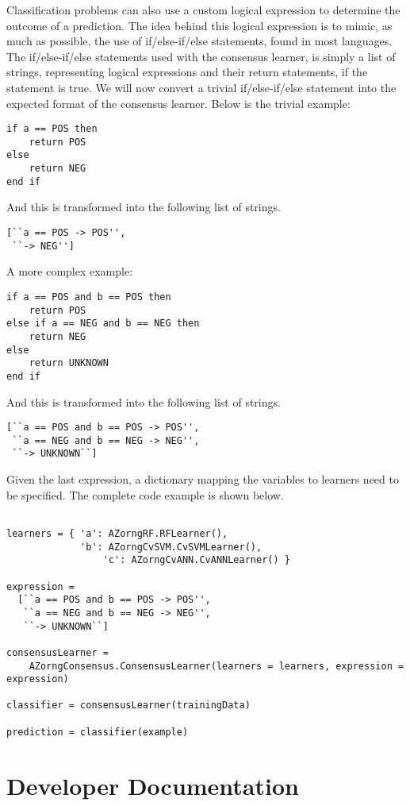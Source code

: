 \documentclass[12pt]{article}
\begin{document}
\newpage
Classification problems can also use a custom logical expression to determine the outcome
of a prediction. The idea behind this logical expression is to mimic, as much as possible,
the use of if/else-if/else statements, found in most languages. The if/else-if/else
statements used with the consensus learner, is simply a list of strings, representing
logical expressions and their return statements, if the statement is true. We will now
convert a trivial if/else-if/else statement into the expected format of the consensus 
learner. Below is the trivial example:

\begin{verbatim}
if a == POS then
    return POS
else
    return NEG
end if
\end{verbatim}

And this is transformed into the following list of strings.

\begin{verbatim}
[``a == POS -> POS'', 
 ``-> NEG'']
\end{verbatim}

A more complex example:

\begin{verbatim}
if a == POS and b == POS then
    return POS
else if a == NEG and b == NEG then
    return NEG
else
    return UNKNOWN
end if
\end{verbatim}

And this is transformed into the following list of strings.

\begin{verbatim}
[``a == POS and b == POS -> POS'', 
 ``a == NEG and b == NEG -> NEG'', 
 ``-> UNKNOWN``]
\end{verbatim}

\newpage
Given the last expression, a dictionary mapping the variables to learners need to
be specified. The complete code example is shown below.

\begin{verbatim}

learners = { 'a': AZorngRF.RFLearner(), 
             'b': AZorngCvSVM.CvSVMLearner(),
	             'c': AZorngCvANN.CvANNLearner() }

expression = 
  [``a == POS and b == POS -> POS'', 
   ``a == NEG and b == NEG -> NEG'', 
   ``-> UNKNOWN``]

consensusLearner = 
    AZorngConsensus.ConsensusLearner(learners = learners, expression = expression)

classifier = consensusLearner(trainingData)

prediction = classifier(example)
\end{verbatim}

\newpage
\section{Developer Documentation}\label{developer}
\end{document}
